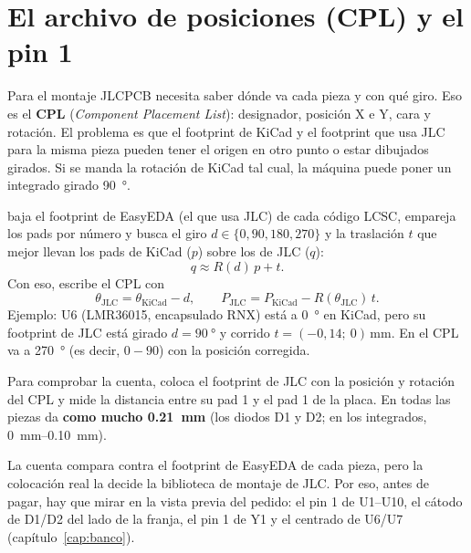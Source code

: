 \section{El archivo de posiciones (CPL) y el pin 1}\label{sec:c11-cpl}

Para el montaje JLCPCB necesita saber dónde va cada pieza y con qué giro. Eso es el \textbf{CPL}
(\emph{Component Placement List}): designador, posición X e Y, cara y rotación. El problema es que el footprint de
KiCad y el footprint que usa JLC para la misma pieza pueden tener el origen en otro punto o estar dibujados girados.
Si se manda la rotación de KiCad tal cual, la máquina puede poner un integrado girado \SI{90}{\degree}.

\begin{calculo}
 baja el footprint de EasyEDA (el que usa JLC) de cada código LCSC, empareja
los pads por número y busca el giro $d \in \{0, 90, 180, 270\}$ y la traslación $t$ que mejor llevan los pads de KiCad
($p$) sobre los de JLC ($q$):
\begin{equation}
q \approx R(d)\,p + t.
\end{equation}
Con eso,  escribe el CPL con
\begin{equation}
\theta_\text{JLC} = \theta_\text{KiCad} - d,\qquad P_\text{JLC} = P_\text{KiCad} - R(\theta_\text{JLC})\,t.
\end{equation}
Ejemplo: U6 (LMR36015, encapsulado RNX) está a \SI{0}{\degree} en KiCad, pero su footprint de JLC está girado
$d = \SI{90}{\degree}$ y corrido $t = (-0{,}14;\ 0)\,\si{\milli\meter}$. En el CPL va a
\SI{270}{\degree} (es decir, $0 - 90$) con la posición corregida.
\end{calculo}

Para comprobar la cuenta,  coloca el footprint de JLC con la posición y rotación
del CPL y mide la distancia entre su pad 1 y el pad 1 de la placa. En todas las piezas da \textbf{como mucho
\SI{0.21}{\milli\meter}} (los diodos D1 y D2; en los integrados, \SIrange{0}{0.10}{\milli\meter}).

\begin{ojo}
La cuenta compara contra el footprint de EasyEDA de cada pieza, pero la colocación real la decide la biblioteca de
montaje de JLC. Por eso, antes de pagar, hay que mirar en la vista previa del pedido: el pin 1 de U1--U10, el cátodo
de D1/D2 del lado de la franja, el pin 1 de Y1 y el centrado de U6/U7 (capítulo~\ref{cap:banco}).
\end{ojo}

